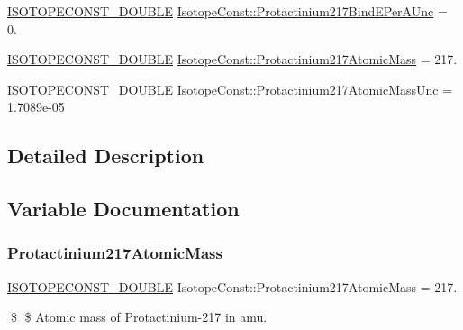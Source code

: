 \begin{DoxyCompactItemize}
\item 
\mbox{\hyperlink{group___isotope_const-_macros_ga8f45a7272ce02c0b4c65c44636ed719a}{I\+S\+O\+T\+O\+P\+E\+C\+O\+N\+S\+T\+\_\+\+D\+O\+U\+B\+LE}} \mbox{\hyperlink{group___isotope_const-_protactinium-_pa217_gaeb756034ef5d8578a622f823bc33299e}{Isotope\+Const\+::\+Protactinium217\+Bind\+E\+Per\+A\+Unc}} = 0.
\item 
\mbox{\hyperlink{group___isotope_const-_macros_ga8f45a7272ce02c0b4c65c44636ed719a}{I\+S\+O\+T\+O\+P\+E\+C\+O\+N\+S\+T\+\_\+\+D\+O\+U\+B\+LE}} \mbox{\hyperlink{group___isotope_const-_protactinium-_pa217_gafdf01551f0c9b80d82cc100242b0c780}{Isotope\+Const\+::\+Protactinium217\+Atomic\+Mass}} = 217.
\item 
\mbox{\hyperlink{group___isotope_const-_macros_ga8f45a7272ce02c0b4c65c44636ed719a}{I\+S\+O\+T\+O\+P\+E\+C\+O\+N\+S\+T\+\_\+\+D\+O\+U\+B\+LE}} \mbox{\hyperlink{group___isotope_const-_protactinium-_pa217_gab34cc38877667a7688df32e3d39118f0}{Isotope\+Const\+::\+Protactinium217\+Atomic\+Mass\+Unc}} = 1.\+7089e-\/05
\end{DoxyCompactItemize}


\subsection{Detailed Description}


\subsection{Variable Documentation}
\mbox{\label{group___isotope_const-_protactinium-_pa217_gafdf01551f0c9b80d82cc100242b0c780}} 
\subsubsection{\texorpdfstring{Protactinium217\+Atomic\+Mass}{Protactinium217AtomicMass}}
{\footnotesize\ttfamily \mbox{\hyperlink{group___isotope_const-_macros_ga8f45a7272ce02c0b4c65c44636ed719a}{I\+S\+O\+T\+O\+P\+E\+C\+O\+N\+S\+T\+\_\+\+D\+O\+U\+B\+LE}} Isotope\+Const\+::\+Protactinium217\+Atomic\+Mass = 217.}

\$ \$ Atomic mass of Protactinium-\/217 in amu. \mbox{\label{group___isotope_const-_protactinium-_pa217_gab34cc38877667a7688df32e3d39118f0}} 
